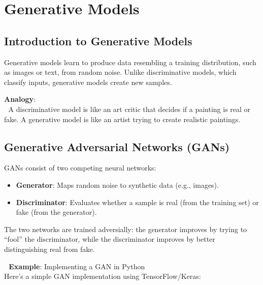 \documentclass[
  letterpaper,
  DIV=11,
  numbers=noendperiod]{scrreprt}
\providecommand{\tightlist}{%
  \setlength{\itemsep}{0pt}\setlength{\parskip}{0pt}}\usepackage{longtable,booktabs,array}
\begin{document}
\section{Generative Models}\label{generative-models}

\subsection{Introduction to Generative
Models}\label{introduction-to-generative-models}

Generative models learn to produce data resembling a training
distribution, such as images or text, from random noise. Unlike
discriminative models, which classify inputs, generative models create
new samples.

\textbf{Analogy}:\\
🎨 A discriminative model is like an art critic that decides if a
painting is real or fake. A generative model is like an artist trying to
create realistic paintings.

\subsection{Generative Adversarial Networks
(GANs)}\label{generative-adversarial-networks-gans}

GANs consist of two competing neural networks:

\begin{itemize}
\tightlist
\item
  \textbf{Generator}: Maps random noise to synthetic data (e.g.,
  images).\\
\item
  \textbf{Discriminator}: Evaluates whether a sample is real (from the
  training set) or fake (from the generator).
\end{itemize}

The two networks are trained adversially: the generator improves by
trying to ``fool'' the discriminator, while the discriminator improves
by better distinguishing real from fake.

\textbf{📌 Example}: Implementing a GAN in Python\\
Here's a simple GAN implementation using TensorFlow/Keras:
\end{document}

